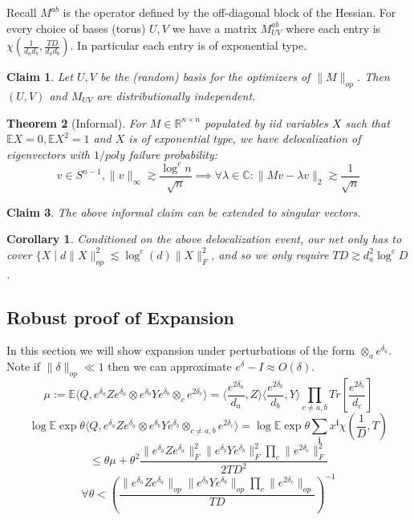 \documentclass{article}
\newtheorem{theorem}{Theorem}
\newtheorem{corollary}{Corollary}
\newtheorem{claim}[theorem]{Claim}
\newcommand{\R}{{\mathbb{R}}}
\newcommand{\C}{{\mathbb{C}}}
\renewcommand{\vec}{\bm}
\newcommand{\E}{\mathbb{E}}
\begin{document}
Recall $M^{ab}$ is the operator defined by the off-diagonal block of the Hessian. For every choice of bases (torus) $U,V$ we have a matrix $M^{ab}_{UV}$ where each entry is $\chi(\frac{1}{d_{a}d_{b}}, \frac{TD}{d_{a}d_{b}})$. In particular each entry is of exponential type.

\begin{claim}
Let $U,V$ be the (random) basis for the optimizers of $\|M\|_{op}$. Then $(U,V)$ and $M_{UV}$ are distributionally independent.
\end{claim}

\begin{theorem} [Informal]
For $M \in \R^{n \times n}$ populated by iid variables $X$ such that $\E X = 0, \E X^{2} = 1$ and $X$ is of exponential type, we have delocalization of eigenvectors with $1/poly$ failure probability:
\[ v \in S^{n-1}, \|v\|_{\infty} \gtrsim \frac{\log^{c} n}{\sqrt{n}} \implies \forall \lambda \in \C: \|Mv - \lambda v\|_{2} \gtrsim \frac{1}{\sqrt{n}}   \]
\end{theorem}


\begin{claim}
The above informal claim can be extended to singular vectors.
\end{claim}

\begin{corollary}
Conditioned on the above delocalization event, our net only has to cover $\{X \mid d \|X\|_{op}^{2} \lesssim \log^{c}(d) \|X\|_{F}^{2}$, and so we only require $TD \gtrsim d_{a}^{2} \log^{c} D$.
\end{corollary}


\subsection{Robust proof of Expansion}
In this section we will show expansion under perturbations of the form $\otimes_{a} e^{\delta_{a}}$. Note if $\|\delta\|_{op} \ll 1$ then we can approximate $e^{\delta} - I \approx O(\delta)$.
\[ \mu := \E \langle Q, e^{\delta_{a}} Z e^{\delta_{a}} \otimes e^{\delta_{b}} Y e^{\delta_{b}} \otimes_{c} e^{2\delta_{c}} \rangle = \langle \frac{e^{2\delta_{a}}}{d_{a}} , Z \rangle \langle \frac{e^{2\delta_{b}}}{d_{b}}, Y \rangle \prod_{c \neq a,b} Tr[\frac{e^{2\delta_{c}}}{d_{c}} ]  \]
\[ \log \E \exp \theta \langle Q, e^{\delta_{a}} Z e^{\delta_{a}} \otimes e^{\delta_{b}} Y e^{\delta_{b}} \otimes_{c \neq a,b} e^{2\delta_{c}} \rangle = \log \E \exp \theta \sum_{\vec{i}} x^{\vec{i}} \chi(\frac{1}{D},T)   \]
\[ \leq \theta \mu + \theta^{2} \frac{\|e^{\delta_{a}} Z e^{\delta_{a}}\|_{F}^{2} \|e^{\delta_{b}} Y e^{\delta_{b}}\|_{F}^{2} \prod_{c} \|e^{2\delta_{c}}\|_{F}^{2}}{2 TD^{2}} \]
\[ \forall \theta < \left( \frac{\|e^{\delta_{a}} Z e^{\delta_{a}}\|_{op} \|e^{\delta_{b}} Y e^{\delta_{b}}\|_{op} \prod_{c} \|e^{2\delta_{c}}\|_{op}}{TD} \right)^{-1}    \]
\end{document}

